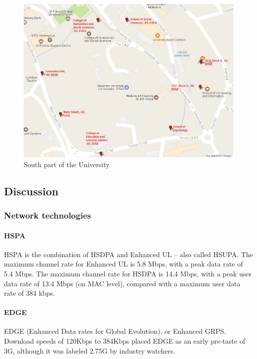 \documentclass{article}
\begin{document}
\begin{figure}
  \includegraphics[width=\linewidth]{south.jpg}
  \caption{South part of the University}
  \label{fig:south}
\end{figure}

		\subsection{Discussion}
			\subsubsection{Network technologies}
				\paragraph{HSPA}
\cite{key:3} HSPA is the combination of HSDPA and Enhanced UL – also called HSUPA.  The maximum channel rate for Enhanced UL is 5.8 Mbps, with a peak data rate of 5.4 Mbps. The maximum channel rate for HSDPA is 14.4 Mbps, with a peak user data rate of 13.4 Mbps (on MAC level), compared with a maximum user data rate of 384 kbps.

				\paragraph{EDGE}
\cite{key:4} EDGE (Enhanced Data rates for Global Evolution), or Enhanced GRPS. Download speeds of 120Kbps to 384Kbps placed EDGE as an early pre-taste of 3G, although it was labeled 2.75G by industry watchers.
\end{document}
